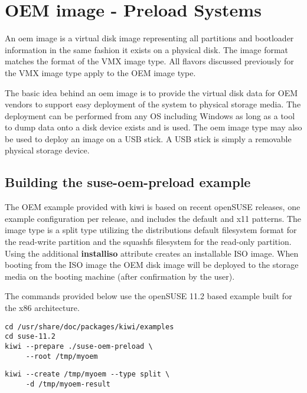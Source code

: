 \chapter{OEM image - Preload Systems}
\label{chapter:oem}
\minitoc

An oem image is a virtual disk image representing all partitions
and bootloader information in the same fashion it exists on a physical
disk. The image format matches the format of the VMX image type. All flavors
discussed previously for the VMX image type apply to the OEM image type.

The basic idea behind an oem image is to provide the virtual disk data
for OEM vendors to support easy deployment of the system to physical
storage media. The deployment can be performed from any OS including
Windows as long as a tool to dump data onto a disk device exists and is 
used. The oem image type may also be used to deploy an image on a USB stick. 
A USB stick is simply a removable physical storage device.

\section{Building the suse-oem-preload example}

The OEM example provided with kiwi is based on recent openSUSE releases, 
one example configuration per release, and includes the default and x11 
patterns. The image type is a split type utilizing the distributions default
filesystem format for the read-write partition and the squashfs filesystem 
for the read-only partition. Using the additional \textbf{installiso} attribute 
creates an installable ISO image. When booting from the ISO image the
OEM disk image will be deployed to the storage media on the booting machine
(after confirmation by the user).

The commands provided below use the openSUSE 11.2 based example built 
for the x86 architecture.

\begin{Command}{12cm}
\begin{verbatim}
cd /usr/share/doc/packages/kiwi/examples
cd suse-11.2
kiwi --prepare ./suse-oem-preload \
     --root /tmp/myoem
\end{verbatim}
\end{Command}

\begin{Command}{12cm}
\begin{verbatim}
kiwi --create /tmp/myoem --type split \
     -d /tmp/myoem-result
\end{verbatim}
\end{Command}

